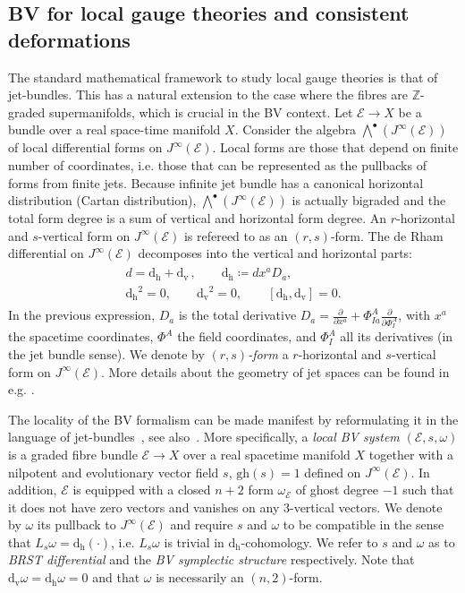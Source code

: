 \documentclass[a4paper,12pt]{article}
\numberwithin{equation}{section} %
\newcommand{\gh}[1]{\mathrm{gh}(#1)}
\newcommand{\dv}{\mathrm{d_v}}
\renewcommand{\d}{\partial}
\renewcommand{\dh}{\mathrm{d_h}}
\newcommand{\fZ}{\mathbb{Z}}
\def\cE{\mathcal{E}}
\newcommand{\pdv}[1]{\frac{\d}{\d #1}}
\begin{document}
\subsection{BV for local gauge theories and consistent deformations}

The standard mathematical framework to study local gauge theories is that of jet-bundles. This has a natural extension  to the case where the fibres are $\fZ$-graded supermanifolds, which is crucial in the BV context. Let $\cE\to X$ be a bundle over a real space-time manifold $X$. Consider the algebra $\bigwedge^\bullet(J^\infty(\mathcal{E}))$ of local differential forms on $J^\infty(\mathcal{E})$. Local forms are those that depend on finite number of coordinates, i.e. those that can be represented as the pullbacks of forms from finite jets. Because infinite jet bundle has a canonical horizontal distribution (Cartan distribution),  $\bigwedge^\bullet(J^\infty(\mathcal{E}))$ is actually bigraded and the total form degree is a sum of vertical and horizontal form degree. An $r$-horizontal and $s$-vertical form on $J^\infty(\mathcal{E})$ is refereed to as an $(r,s)$-form. The de Rham differential on $J^\infty(\mathcal{E})$ decomposes into the vertical and horizontal parts:
\begin{align}
\begin{gathered}
	d=\dh+\dv\,, \qquad \dh\coloneqq dx^a D_a, \\
    \dh^2=0,\qquad \dv^2=0, \qquad [\dh,\dv] = 0.
\end{gathered}
\end{align}
In the previous expression, $D_a$ is the total derivative $D_a = \pdv{x^a} + \Phi^A_{Ia}\pdv{\Phi^A_I}$, with $x^a$ the spacetime coordinates, $\Phi^A$ the field coordinates, and $\Phi^A_I$ all its derivatives (in the jet bundle sense). We denote by \textit{$(r,s)$-form} a $r$-horizontal and $s$-vertical form on $J^\infty(\mathcal{E})$.
More details about the geometry of jet spaces can be found in e.g. \cite{Anderson1991,Krasil'shchik:2010ij}. 

The locality of the BV formalism can be made manifest by reformulating it in the language of jet-bundles~\cite{Henneaux:1993hv,Barnich:1995db}, see also~\cite{Piguet:1995er,Barnich:2000zw}. More specifically, a \textit{local BV system} $(\mathcal{E},s,\omega)$ is a graded  fibre bundle $\mathcal{E}\rightarrow X$ over a real spacetime manifold $X$ together with a nilpotent and evolutionary vector field $s$, $\gh{s}=1$ defined on $J^\infty(\mathcal{E})$. In addition, $\cE$ is equipped with a closed  $n+2$ form $\omega_\cE$ of ghost degree $-1$ such that it does not have zero vectors and vanishes on any $3$-vertical vectors. We denote by $\omega$ its pullback to $J^\infty(\mathcal{E})$ and require $s$ and $\omega$ to be compatible in the sense that $L_s\omega=\dh(\cdot)$, i.e. $L_s\omega$ is trivial in $\dh$-cohomology. We refer to $s$ and $\omega$ as to \textit{BRST differential} and the \textit{BV symplectic structure} respectively. Note that $\dv\omega=\dh\omega=0$ and that $\omega$ is necessarily an $(n,2)$-form.
\end{document}
